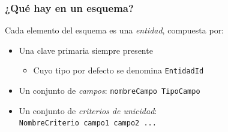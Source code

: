 \documentclass{beamer}
\begin{document}
\begin{frame}[fragile]
\frametitle{¿Qué hay en un esquema?}
Cada elemento del esquema es una \emph{entidad}, compuesta por:
\begin{itemize}
\item Una clave primaria siempre presente
\begin{itemize}
\item Cuyo tipo por defecto se denomina {\tt EntidadId}
\end{itemize}
\item Un conjunto de \emph{campos}: {\tt nombreCampo TipoCampo}
\item Un conjunto de \emph{criterios de unicidad}: \\
{\tt NombreCriterio campo1 campo2 ...}
\end{itemize}
\end{frame}
\end{document}
